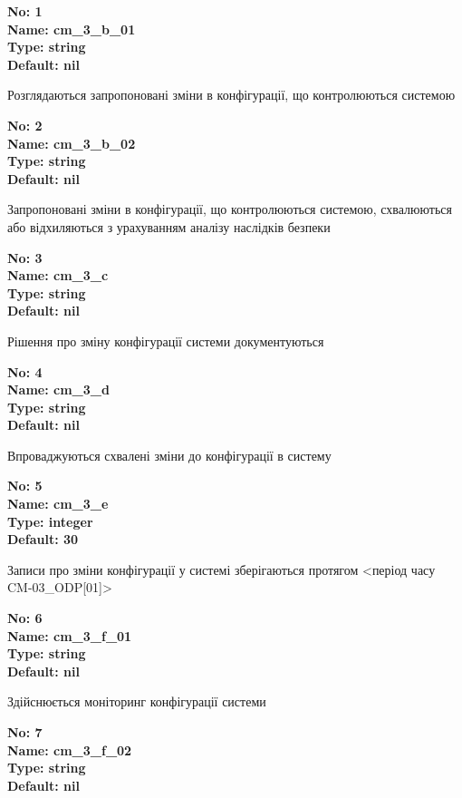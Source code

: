 \documentclass{article}
\begin{document}
\vspace{10pt}
{\footnotesize\bfseries
No: 1\\
Name: cm\_\allowbreak{}3\_\allowbreak{}b\_\allowbreak{}01\\
Type: string\\
Default: nil
}

{\footnotesize Розглядаються запропоновані зміни в конфігурації, що контролюються системою}


{\footnotesize\bfseries
No: 2\\
Name: cm\_\allowbreak{}3\_\allowbreak{}b\_\allowbreak{}02\\
Type: string\\
Default: nil
}

{\footnotesize Запропоновані зміни в конфігурації, що контролюються системою, схвалюються або відхиляються з урахуванням аналізу наслідків безпеки}


{\footnotesize\bfseries
No: 3\\
Name: cm\_\allowbreak{}3\_\allowbreak{}c\\
Type: string\\
Default: nil
}

{\footnotesize Рішення про зміну конфігурації системи документуються}


{\footnotesize\bfseries
No: 4\\
Name: cm\_\allowbreak{}3\_\allowbreak{}d\\
Type: string\\
Default: nil
}

{\footnotesize Впроваджуються схвалені зміни до конфігурації в систему}


{\footnotesize\bfseries
No: 5\\
Name: cm\_\allowbreak{}3\_\allowbreak{}e\\
Type: integer\\
Default: 30
}

{\footnotesize Записи про зміни конфігурації у системі зберігаються протягом <період часу CM-03\_\allowbreak{}ODP[01]>}


{\footnotesize\bfseries
No: 6\\
Name: cm\_\allowbreak{}3\_\allowbreak{}f\_\allowbreak{}01\\
Type: string\\
Default: nil
}

{\footnotesize Здійснюється моніторинг конфігурації системи}


{\footnotesize\bfseries
No: 7\\
Name: cm\_\allowbreak{}3\_\allowbreak{}f\_\allowbreak{}02\\
Type: string\\
Default: nil
}
\end{document}
